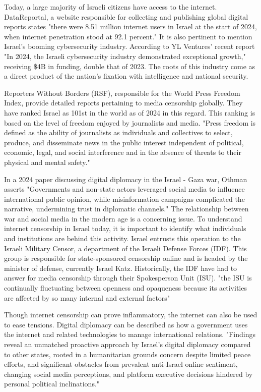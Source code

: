 Today, a large majority of Israeli citizens have access to the internet. DataReportal, a website responsible for collecting and publishing global digital reports states "there were 8.51 million internet users in Israel at the start of 2024, when internet penetration stood at 92.1 percent." \cite{Digital2024Israel} It is also pertinent to mention Israel's booming cybersecurity industry. According to YL Ventures' recent report "In 2024, the Israeli cybersecurity industry demonstrated exceptional growth," receiving \$4B in funding, double that of 2023. The roots of this industry come as a direct product of the nation's fixation with intelligence and national security. 


Reporters Without Borders (RSF), responsible for the World Press Freedom Index, provide detailed reports pertaining to media censorship globally. They have ranked Israel as 101st in the world as of 2024 in this regard. This ranking is based on the level of freedom enjoyed by journalists and media. "Press freedom is defined as the ability of journalists as individuals and collectives to select, produce, and disseminate news in the public interest independent of political, economic, legal, and social interference and in the absence of threats to their physical and mental safety." \cite{rsf_israel} 

In a 2024 paper discussing digital diplomacy in the Israel - Gaza war, Othman asserts "Governments and non-state actors leveraged social media to influence international public opinion, while misinformation campaigns complicated the narrative, undermining trust in diplomatic channels." \cite{Othman2025DigitalDiplomacy} The relationship between war and social media in the modern age is a concerning issue. To understand internet censorship in Israel today, it is important to identify what individuals and institutions are behind this activity. Israel entrusts this operation to the Israeli Military Censor, a department of the Israeli Defense Forces (IDF). This group is responsible for state-sponsored censorship online and is headed by the minister of defense, currently Israel Katz.\cite{MOD_Israel} Historically, the IDF have had to answer for media censorship through their Spokesperson Unit (ISU). "the ISU is continually fluctuating between openness and opaqueness because its activities are affected by so many internal and external factors" \cite{MAGEN2018287} 

Though internet censorship can prove inflammatory, the internet can also be used to ease tensions. Digital diplomacy can be described as how a government uses the internet and related technologies to manage international relations. "Findings reveal an unmatched proactive approach by Israel’s digital diplomacy compared to other states, rooted in a humanitarian grounds concern despite limited peace efforts, and significant obstacles from prevalent anti-Israel online sentiment, changing social media perceptions, and platform executive decisions hindered by personal political inclinations." \cite{Othman2025DigitalDiplomacy} 

